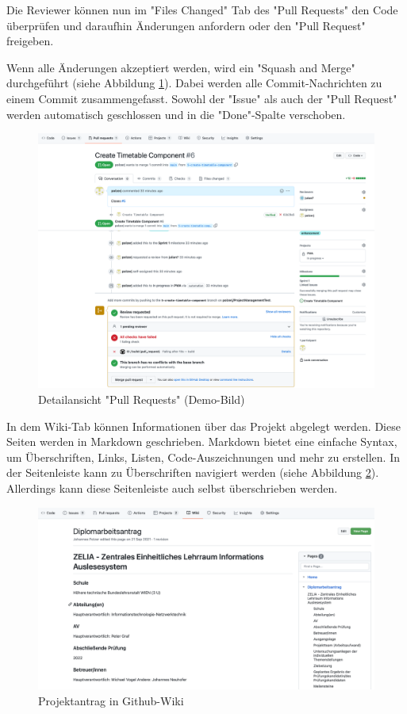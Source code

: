 Die Reviewer können nun im "Files Changed" Tab des "Pull Requests" den Code überprüfen und daraufhin Änderungen anfordern oder den "Pull Request" freigeben. 

Wenn alle Änderungen akzeptiert werden, wird ein "Squash and Merge" durchgeführt (siehe Abbildung \ref{fig:pullInfo}).
Dabei werden alle Commit-Nachrichten  zu einem Commit zusammen\-gefasst. 
Sowohl der "Issue" als auch der "Pull Request" werden automatisch geschlossen und in die "Done"-Spalte verschoben.
\cite{GithubFS}

\begin{figure}[H]
    \centering
    \includegraphics[width=\textwidth]{media/ProjectManagement/PullInfo.png}
    \caption{Detailansicht "Pull Requests" (Demo-Bild)}
    \label{fig:pullInfo}
\end{figure}


In dem Wiki-Tab können Informationen über das Projekt abgelegt werden. Diese Seiten werden in Markdown geschrieben. Markdown bietet eine einfache Syntax, um Überschriften, Links, Listen, Code-Auszeichnungen und mehr zu erstellen. In der Seitenleiste kann zu Überschriften navigiert werden (siehe Abbildung \ref{fig:Projektantrag}). Allerdings kann diese Seitenleiste auch selbst überschrieben werden.

\begin{figure}[H]
    \centering
    \includegraphics[width=\textwidth]{media/ProjectManagement/Wiki.png}
    \caption{Projektantrag in Github-Wiki}
    \label{fig:Projektantrag}
\end{figure}

